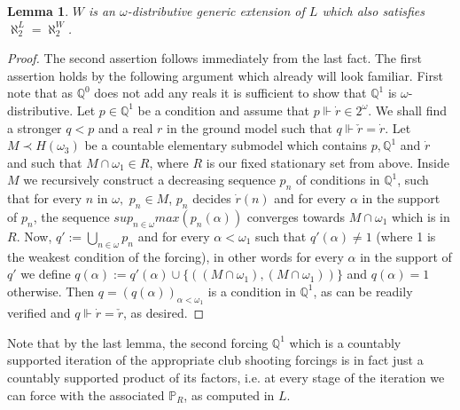 \documentclass[a4paper,11pt]{article}
\newtheorem{lemma}[theorem]{Lemma}
\newcommand{\forceP}{\mathbb{P}}
\newcommand{\forceQ}{\mathbb{Q}}
\begin{document}
\begin{lemma}
$W$ is an $\omega$-distributive generic extension of $L$ which also satisfies $\aleph_2^L=\aleph_2^W$.
\end{lemma}
\begin{proof}
The second assertion follows immediately from the last {fact}. The first assertion holds by the following argument which already will look familiar. First note that as $\forceQ^0$ does not add any reals it is sufficient to show that $\forceQ^1$ is $\omega$-distributive.
Let $p \in \forceQ^1$ be a condition and assume that $p \Vdash \dot{r} \in 2^{\omega}$. We shall find a stronger $q < p$ and a real $r$ in the ground model such that $q \Vdash \check{r}=\dot{r}$. Let $M \prec H(\omega_3)$ be a countable elementary submodel which contains $p, \forceQ^1$ and $\dot{r}$ and such that $M \cap \omega_1 \in R$, where $R$ is our fixed stationary set from above. Inside $M$ we recursively construct a decreasing sequence $p_n$ of conditions in $\forceQ^1$, such that for every $n$ in $\omega,$ $p_n \in M$, $p_n$ decides $\dot{r}(n)$ and for every $\alpha$ in the support of $p_n$, the sequence $sup_{n \in \omega} max( p_n(\alpha))$ converges towards $M \cap \omega_1$ which is in $R$. Now, $q':= \bigcup_{n \in \omega} p_n$ and for every $\alpha< \omega_1$ such that $q'(\alpha)\ne 1$ (where 1 is the weakest condition of the forcing),  in other words for every $\alpha$ in the support of $q'$ we define $q(\alpha):= q'(\alpha) \cup \{((M \cap \omega_1), (M \cap \omega_1))\}$ and $q(\alpha)=1$ otherwise. Then $q=(q(\alpha))_{\alpha < \omega_1}$ is a condition in $\forceQ^1$, as can be readily verified and $q \Vdash \dot{r} = \check{r}$, as desired.
\end{proof}
Note that by the last lemma, the second forcing $\forceQ^1$ which is {a} countably supported iteration of the appropriate club shooting forcings is in fact just a countably supported product of its factors, i.e. at every stage of the iteration we can force with the associated $\forceP_R$, as computed in $L$.
\end{document}
